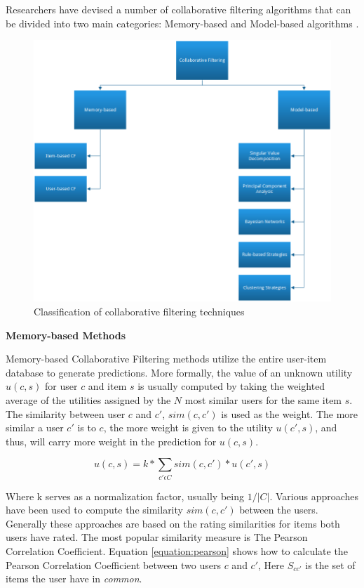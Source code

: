 Researchers have devised a number of collaborative filtering algorithms that can be divided into two main categories: Memory-based and Model-based algorithms \cite{Su2009}.\linebreak[4]

\begin{figure}[H]
    \includegraphics[width=5in]{image/cftaxonomy.png}
    \centering
    \caption[Classification of collaborative filtering techniques]{Classification of collaborative filtering techniques}
    \label{figure:cftaxonomy}
\end{figure}

\textbf{Memory-based Methods}

Memory-based Collaborative Filtering methods utilize the entire user-item database to generate predictions. More formally, the value of an unknown utility $u(c,s)$ for user $c$ and item $s$ is usually computed by taking the weighted average of the utilities assigned by the $N$ most similar users for the same item $s$. The similarity between user $c$ and $c'$, $sim(c, c')$ is used as the weight. The more similar a user $c'$ is to $c$, the more weight is given to the utility $u(c', s)$, and thus, will carry more weight in the prediction for $u(c,s)$.

\begin{equation}
\label{equation:cfratingprediction}
u(c,s) = k * \sum_{c' \epsilon C} sim(c, c') * u(c',s)
\end{equation}

Where k serves as a normalization factor, usually being $1/|C|$. Various approaches have been used to compute the similarity $sim(c, c')$ between the users. Generally these approaches are based on the rating similarities for items both users have rated. The most popular similarity measure is The Pearson Correlation Coefficient. Equation \ref{equation:pearson} shows how to calculate the Pearson Correlation Coefficient between two users $c$ and $c'$, Here $S_{cc'}$ is the set of items the user have in \emph{common}.

